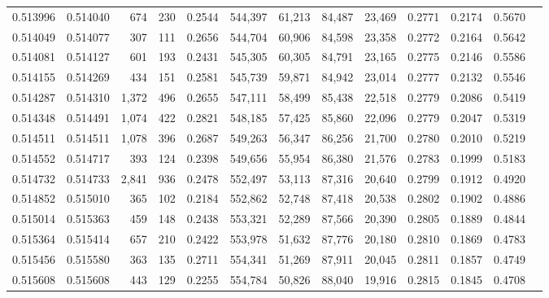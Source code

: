 \begin{tabular}{rrrrrrrrrrrrr}
0.513996 & 0.514040 &   674 &   230 &                                     0.2544 & 544,397 &  61,213 &  84,487 &  23,469 & 0.2771 & 0.2174 & 0.5670 \\
0.514049 & 0.514077 &   307 &   111 &                                     0.2656 & 544,704 &  60,906 &  84,598 &  23,358 & 0.2772 & 0.2164 & 0.5642 \\
0.514081 & 0.514127 &   601 &   193 &                                     0.2431 & 545,305 &  60,305 &  84,791 &  23,165 & 0.2775 & 0.2146 & 0.5586 \\
0.514155 & 0.514269 &   434 &   151 &                                     0.2581 & 545,739 &  59,871 &  84,942 &  23,014 & 0.2777 & 0.2132 & 0.5546 \\
0.514287 & 0.514310 & 1,372 &   496 &                                     0.2655 & 547,111 &  58,499 &  85,438 &  22,518 & 0.2779 & 0.2086 & 0.5419 \\
0.514348 & 0.514491 & 1,074 &   422 &                                     0.2821 & 548,185 &  57,425 &  85,860 &  22,096 & 0.2779 & 0.2047 & 0.5319 \\
0.514511 & 0.514511 & 1,078 &   396 &                                     0.2687 & 549,263 &  56,347 &  86,256 &  21,700 & 0.2780 & 0.2010 & 0.5219 \\
0.514552 & 0.514717 &   393 &   124 &                                     0.2398 & 549,656 &  55,954 &  86,380 &  21,576 & 0.2783 & 0.1999 & 0.5183 \\
0.514732 & 0.514733 & 2,841 &   936 &                                     0.2478 & 552,497 &  53,113 &  87,316 &  20,640 & 0.2799 & 0.1912 & 0.4920 \\
0.514852 & 0.515010 &   365 &   102 &                                     0.2184 & 552,862 &  52,748 &  87,418 &  20,538 & 0.2802 & 0.1902 & 0.4886 \\
0.515014 & 0.515363 &   459 &   148 &                                     0.2438 & 553,321 &  52,289 &  87,566 &  20,390 & 0.2805 & 0.1889 & 0.4844 \\
0.515364 & 0.515414 &   657 &   210 &                                     0.2422 & 553,978 &  51,632 &  87,776 &  20,180 & 0.2810 & 0.1869 & 0.4783 \\
0.515456 & 0.515580 &   363 &   135 &                                     0.2711 & 554,341 &  51,269 &  87,911 &  20,045 & 0.2811 & 0.1857 & 0.4749 \\
0.515608 & 0.515608 &   443 &   129 &                                     0.2255 & 554,784 &  50,826 &  88,040 &  19,916 & 0.2815 & 0.1845 & 0.4708 \\

\end{tabular}
